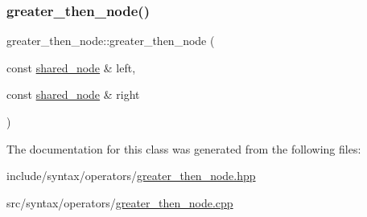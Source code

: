 \subsubsection{\texorpdfstring{greater\+\_\+then\+\_\+node()}{greater\_then\_node()}}
{\footnotesize\ttfamily greater\+\_\+then\+\_\+node\+::greater\+\_\+then\+\_\+node (\begin{DoxyParamCaption}\item[{const \hyperlink{namespacejawe_a3f307481d921b6cbb50cc8511fc2b544}{shared\+\_\+node} \&}]{left,  }\item[{const \hyperlink{namespacejawe_a3f307481d921b6cbb50cc8511fc2b544}{shared\+\_\+node} \&}]{right }\end{DoxyParamCaption})}



The documentation for this class was generated from the following files\+:\begin{DoxyCompactItemize}
\item 
include/syntax/operators/\hyperlink{greater__then__node_8hpp}{greater\+\_\+then\+\_\+node.\+hpp}\item 
src/syntax/operators/\hyperlink{greater__then__node_8cpp}{greater\+\_\+then\+\_\+node.\+cpp}\end{DoxyCompactItemize}
